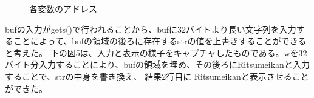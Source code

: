 \documentclass[dvipdfmx,autodetect-engine,titlepage]{jsarticle}
\begin{document}
\begin{figure}[H]
  \centering
  \caption{各変数のアドレス}\label{fig:図10}
\end{figure}

bufの入力がgets()で行われることから、bufに32バイトより長い文字列を入力することによって、bufの領域の後ろに存在するstrの値を上書きすることができると考えた。
下の図5は、入力と表示の様子をキャプチャしたものである。wを32バイト分入力することにより、bufの領域を埋め、その後ろにRitsumeikanと入力することで、strの中身を書き換え、
結果2行目に
Ritsumeikanと表示させることができた。\\
\begin{figure}[H]
  \centering
  \caption{}\label{fig:図4}
\end{figure}
\end{document}
